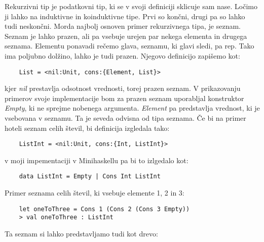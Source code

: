\documentclass[a4paper]{report}
\begin{document}
Rekurzivni tip je podatkovni tip, ki se v svoji definiciji sklicuje sam nase. Ločimo ji lahko na induktivne in koinduktivne tipe. Prvi so končni, drugi pa so lahko tudi neskončni. 
Morda najbolj osnoven primer rekurzivnega tipa, je seznam. Seznam je lahko prazen, ali pa vsebuje urejen par nekega elementa in drugega seznama. Elementu ponavadi rečemo glava, seznamu, 
ki glavi sledi, pa rep. Tako ima poljubno dolžino, lahko je tudi prazen. Njegovo definicijo zapišemo kot:
\begin{lstlisting}
    List = <nil:Unit, cons:{Element, List}>
\end{lstlisting}
kjer \emph{nil} prestavlja odsotnost vrednosti, torej prazen seznam. V prikazovanju primerov svoje implementacije bom za prazen seznam uporabljal konstruktor \emph{Empty}, 
ki ne sprejme nobenega argumenta. \emph{Element} pa predstavlja vrednost, ki je vsebovana v seznamu. Ta je seveda odvisna od tipa seznama. Če bi na primer hoteli seznam celih števil, 
bi definicija izgledala tako:
\begin{lstlisting}
    ListInt = <nil:Unit, cons:{Int, ListInt}>
\end{lstlisting}
v moji impementaciji v Minihaskellu pa bi to izlgedalo kot:
\begin{lstlisting}
    data ListInt = Empty | Cons Int ListInt
\end{lstlisting}
Primer seznama celih števil, ki vsebuje elemente 1, 2 in 3:
\begin{lstlisting}
    let oneToThree = Cons 1 (Cons 2 (Cons 3 Empty))
    > val oneToThree : ListInt
\end{lstlisting}

Ta seznam si lahko predstavljamo tudi kot drevo:

\begin{center}
\end{center}
\end{document}
